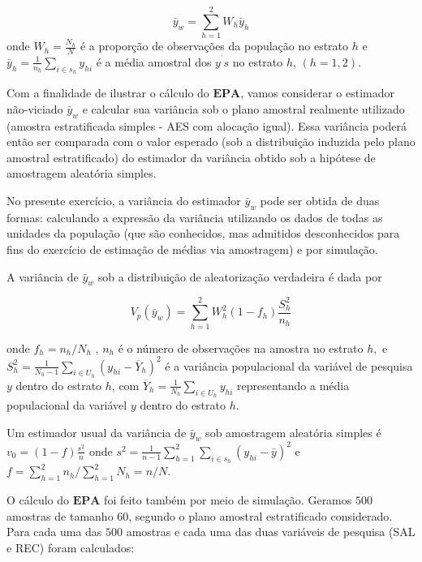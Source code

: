 \documentclass[]{book}
\theoremstyle{definition}
\theoremstyle{definition}
\theoremstyle{definition}
\theoremstyle{remark}
\begin{document}
\[
\bar{y}_{w}=\sum\limits_{h=1}^{2}W_{h}\bar{y}_{h} 
\] onde \(W_{h}=\frac{N_{h}}{N}\) é a proporção de observações da
população no estrato \(h\) e
\(\bar{y}_{h}=\frac{1}{n_{h}}\sum\limits_{i\in s_{h}}y_{hi}\) é a média
amostral dos \(y^{^{\prime}}s\) no estrato \(h\), \((h=1,2)\).

Com a finalidade de ilustrar o cálculo do \(\mathbf{EPA}\), vamos
considerar o estimador não-viciado \(\bar{y}_{w}\) e calcular sua
variância sob o plano amostral realmente utilizado (amostra
estratificada simples - AES com alocação igual). Essa variância poderá
então ser comparada com o valor esperado (sob a distribuição induzida
pelo plano amostral estratificado) do estimador da variância obtido sob
a hipótese de amostragem aleatória simples.

No presente exercício, a variância do estimador \(\bar{y}_{w}\) pode ser
obtida de duas formas: calculando a expressão da variância utilizando os
dados de todas as unidades da população (que são conhecidos, mas
admitidos desconhecidos para fins do exercício de estimação de médias
via amostragem) e por simulação.

A variância de \(\bar{y}_{w}\) sob a distribuição de aleatorização
verdadeira é dada por

\begin{equation}
V_{p}\left( \bar{y}_{w}\right) =\sum\limits_{h=1}^{2}W_{h}^{2}\left(
1-f_{h}\right) \frac{S_{h}^{2}}{n_{h}}  \label{eq:epa3}
\end{equation}

onde \(f_{h}=n_{h}/N_{h}\) , \(n_{h}\) é o número de observações na
amostra no estrato \(h,\) e
\(S_{h}^{2}=\frac{1}{N_{h}-1}\sum\limits_{i\in U_{h}}\left( y_{hi}-\overline{Y}_{h}\right) ^{2}\)
é a variância populacional da variável de pesquisa \(y\) dentro do
estrato \(h\), com
\(\overline{Y}_{h}=\frac{1}{N_{h}}\sum\limits_{i\in U_{h}}y_{hi}\)
representando a média populacional da variável \(y\) dentro do estrato
\(h\).

Um estimador usual da variância de \(\bar{y}_{w}\) sob amostragem
aleatória simples é \(v_{0}=\left( 1-f\right) \frac{s^{2}}{n}\) onde
\(s^{2}=\frac{1}{n-1}\sum\limits_{h=1}^{2}\sum\limits_{i\in s_{h}}\left(y_{hi}-\bar{y}\right) ^{2}\)
e \(f=\sum_{h=1}^{2}n_{h}/\sum_{h=1}^{2}N_{h} =n/N\).

O cálculo do \(\mathbf{EPA}\) foi feito também por meio de simulação.
Geramos \(500\) amostras de tamanho \(60\), segundo o plano amostral
estratificado considerado. Para cada uma das \(500\) amostras e cada uma
das duas variáveis de pesquisa (SAL e REC) foram calculados:
\end{document}
